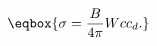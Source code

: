 
\begin{equation}
    \label{eqn:rotorsourcestrengths}
    \eqbox{
        \sigma = \frac{B}{4 \pi} W c c_d.
    }
\end{equation}


%
%
%
%
%
%
%
%






